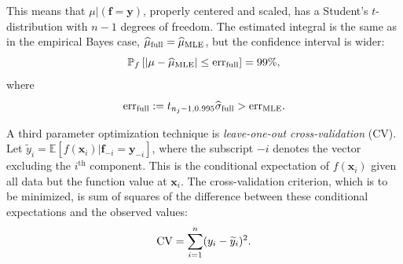 \documentclass{iitthesis}          %
\newcommand{\bm}[1]{\boldsymbol{#1}}
\newcommand{\Ex}{\mathbb{E}}
\newcommand{\vf}{\bm{f}}
\newcommand{\vx}{\bm{x}}
\newcommand{\vy}{\bm{y}}
\newcommand{\hmu}{\widehat{\mu}}
\newcommand{\hsigma}{\widehat{\sigma}}
\newcommand{\MLE}{\textup{MLE}}
\newcommand{\err}{\textup{err}}
\begin{document}
This means that $\mu \vert (\vf = \vy )$, properly centered and scaled, has a Student's $t$-distribution with $n-1$ degrees of freedom.   The estimated integral is the same as in the empirical Bayes case, $\hmu_{\textup{full}} = \hmu_{\MLE}$, but the confidence interval is wider:
\begin{equation*}
\mathbb{P}_f \left[
|\mu-\hmu_\MLE| \leq \err_{\textup{full}} \right]  = 99\%,
\end{equation*}
where
\begin{equation*}
\err_{\textup{full}} 
:= t_{n_j-1,0.995} \hsigma_{\textup{full}} > \err_\MLE .
\end{equation*}


\fi



























 \label{sec:GCV}
A third parameter optimization technique is \emph{leave-one-out cross-validation} (CV).  Let $\widetilde{y}_i = \Ex[f(\vx_i ) | \vf_{-i} = \vy_{-i}]$, where the subscript $-i$ denotes the vector excluding the $i^{\text{th}}$ component.  This is the conditional expectation of $f(\vx_i )$ given all data but the function value at $\vx_i$.  The cross-validation criterion, which is to be minimized, is sum of squares of the difference between these conditional expectations and the observed values:
\begin{equation} \label{FJH:eq:CVA}
\textup{CV} = \sum_{i=1}^n (y_i - \widetilde{y}_i)^2.
\end{equation}
\end{document}
